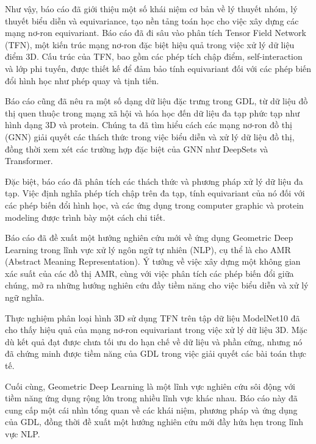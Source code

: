 Như vậy, báo cáo đã giới thiệu một số khái niệm cơ bản về lý thuyết nhóm, lý thuyết biểu diễn và equivariance, tạo nền tảng toán học cho việc xây dựng các mạng nơ-ron equivariant. Báo cáo đã đi sâu vào phân tích Tensor Field Network (TFN), một kiến trúc mạng nơ-ron đặc biệt hiệu quả trong việc xử lý dữ liệu điểm 3D. Cấu trúc của TFN, bao gồm các phép tích chập điểm, self-interaction và lớp phi tuyến, được thiết kế để đảm bảo tính equivariant đối với các phép biến đổi hình học như phép quay và tịnh tiến.

Báo cáo cũng đã nêu ra một số dạng dữ liệu đặc trưng trong GDL, từ dữ liệu đồ thị quen thuộc trong mạng xã hội và hóa học đến dữ liệu đa tạp phức tạp như hình dạng 3D và protein. Chúng ta đã tìm hiểu cách các mạng nơ-ron đồ thị (GNN) giải quyết các thách thức trong việc biểu diễn và xử lý dữ liệu đồ thị, đồng thời xem xét các trường hợp đặc biệt của GNN như DeepSets và Transformer.

Đặc biệt, báo cáo đã phân tích các thách thức và phương pháp xử lý dữ liệu đa tạp. Việc định nghĩa phép tích chập trên đa tạp, tính equivariant của nó đối với các phép biến đổi hình học, và các ứng dụng trong computer graphic và protein modeling được trình bày một cách chi tiết.

Báo cáo đã đề xuất một hướng nghiên cứu mới về ứng dụng Geometric Deep Learning trong lĩnh vực xử lý ngôn ngữ tự nhiên (NLP), cụ thể là cho AMR (Abstract Meaning Representation). Ý tưởng về việc xây dựng một không gian xác suất của các đồ thị AMR, cùng với việc phân tích các phép biến đổi giữa chúng, mở ra những hướng nghiên cứu đầy tiềm năng cho việc biểu diễn và xử lý ngữ nghĩa.

Thực nghiệm phân loại hình 3D sử dụng TFN trên tập dữ liệu ModelNet10 đã cho thấy hiệu quả của mạng nơ-ron equivariant trong việc xử lý dữ liệu 3D. Mặc dù kết quả đạt được chưa tối ưu do hạn chế về dữ liệu và phần cứng, nhưng nó đã chứng minh được tiềm năng của GDL trong việc giải quyết các bài toán thực tế.

Cuối cùng, Geometric Deep Learning là một lĩnh vực nghiên cứu sôi động với tiềm năng ứng dụng rộng lớn trong nhiều lĩnh vực khác nhau. Báo cáo này đã cung cấp một cái nhìn tổng quan về các khái niệm, phương pháp và ứng dụng của GDL, đồng thời đề xuất một hướng nghiên cứu mới đầy hứa hẹn trong lĩnh vực NLP.
